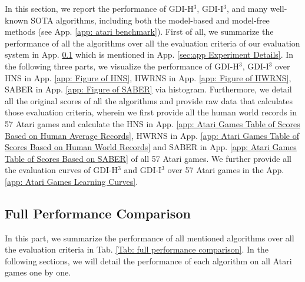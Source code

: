 \documentclass[nohyperref]{article}
\theoremstyle{plain}
\begin{document}
In this section, we report the performance of GDI-H$^3$, GDI-I$^3$, and many well-known SOTA algorithms, including both the model-based and model-free methods (see App. \ref{app: atari benchmark}). First of all, we summarize the performance of all the algorithms over all the evaluation criteria of our evaluation system in App. \ref{app: Full Performance Comparison} which is mentioned in App. \ref{sec:app Experiment Details}. In the following three parts, we visualize the performance of GDI-H$^3$, GDI-I$^3$ over HNS in App. \ref{app: Figure of HNS}, HWRNS in App. \ref{app: Figure of HWRNS}, SABER in App. \ref{app: Figure of SABER} via histogram. Furthermore, we detail all the original scores of all the algorithms and provide raw data that calculates those  evaluation criteria, wherein we first provide all the human world records in 57 Atari games and calculate the HNS in App. \ref{app: Atari Games Table of Scores Based on Human Average Records}, HWRNS in App. \ref{app: Atari Games Table of Scores Based on Human World Records} and SABER in App. \ref{app: Atari Games Table of Scores Based on SABER} of all 57 Atari games. We further provide all the evaluation curves of GDI-H$^3$ and GDI-I$^3$ over 57 Atari games in the App. \ref{app: Atari Games Learning Curves}.

\subsection{Full Performance Comparison}
\label{app: Full Performance Comparison}
In this part, we summarize the performance of all mentioned algorithms over all the evaluation criteria in Tab. \ref{Tab: full performance comparison}. In the following sections, we will detail the performance of each algorithm on all Atari games one by one. 
\end{document}
